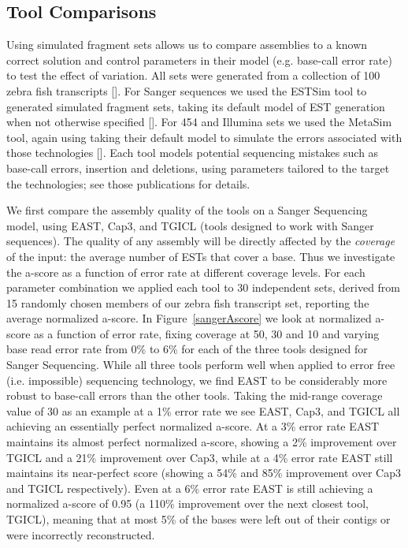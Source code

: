 \documentclass{bioinfo}
\newcommand{\capthree} {{\small Cap3}}
\newcommand{\estsim}{{\small ESTSim}}
\newcommand{\metasim} {{\small MetaSim}}
\newcommand{\tgicl} {{\small TGICL}}
\newcommand{\east} {{\small EAST}}
\begin{document}
\subsection*{Tool Comparisons}
Using simulated fragment sets allows us to compare assemblies to a
known correct solution and control parameters in their model
(e.g. base-call error rate) to test the effect of variation.  All sets
were generated from a collection of 100 zebra fish transcripts
[\cite{Hazelhurst08}].  For Sanger sequences we used the \estsim\/
tool to generated simulated fragment sets, taking its default model of
EST generation when not otherwise specified [\cite{Hazelhurst03}].
For 454 and Illumina sets we used the \metasim\/ tool, again using
taking their default model to simulate the errors associated with
those technologies [\cite{Richter08}].  Each tool models potential
sequencing mistakes such as base-call errors, insertion and deletions,
using parameters tailored to the target the technologies; see those
publications for details.

\vspace{3mm}

 We first compare the assembly
quality of the tools on a Sanger Sequencing model, using \east,
\capthree, and \tgicl\/ (tools designed to work with Sanger
sequences).  The quality of any assembly will be directly affected by
the {\it coverage} of the input: the average number of ESTs that cover
a base.  Thus we investigate the a-score as a function of error rate
at different coverage levels.  For each parameter combination we
applied each tool to 30 independent sets, derived from 15 randomly
chosen members of our zebra fish transcript set, reporting the average
normalized a-score.  In Figure~\ref{sangerAscore} we look at
normalized a-score as a function of error rate, fixing coverage at 50,
30 and 10 and varying base read error rate from 0\% to 6\% for each of
the three tools designed for Sanger Sequencing.  While all three tools
perform well when applied to error free (i.e. impossible) sequencing
technology, we find \east\/ to be considerably more robust to
base-call errors than the other tools.  Taking the mid-range coverage
value of 30 as an example at a 1\% error rate we see \east,
\capthree, and \tgicl\/ all achieving an essentially perfect
normalized a-score.  At a 3\% error rate \east\/ maintains its almost
perfect normalized a-score, showing a 2\% improvement over \tgicl\/
and a 21\% improvement over \capthree, while at a 4\% error rate \east\/
still maintains its near-perfect score (showing a 54\% and 85\%
improvement over \capthree\/ and \tgicl\/ respectively).  Even at a
6\% error rate \east\/ is still achieving a normalized a-score of 0.95
(a 110\% improvement over the next closest tool, \tgicl\/), meaning
that at most 5\% of the bases were left out of their contigs or were
incorrectly reconstructed.
\end{document}
